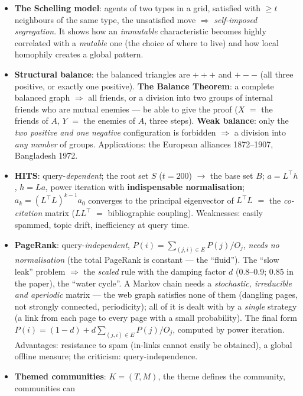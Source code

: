 \documentclass[11pt,a4paper]{article}
\theoremstyle{definition}
\providecommand{\uv}[1]{``#1''}
\begin{document}
\begin{itemize}
      \emph{diminishing returns}.
\item \textbf{The Schelling model}: agents of two types in a grid, satisfied with $\ge t$ neighbours of
      the same type, the unsatisfied move $\Rightarrow$ \emph{self-imposed segregation}. It shows how an
      \emph{immutable} characteristic becomes highly correlated with a \emph{mutable} one (the choice of
      where to live) and how local homophily creates a global pattern.
\item \textbf{Structural balance}: the balanced triangles are $+{+}{+}$ and $+{-}{-}$ (all three
      positive, or exactly one positive). \textbf{The Balance Theorem}: a complete balanced graph
      $\Rightarrow$ all friends, or a division into two groups of internal friends who are mutual
      enemies --- be able to give the proof ($X$ $=$ the friends of $A$, $Y$ $=$ the enemies of $A$,
      three steps). \textbf{Weak balance}: only the \emph{two positive and one negative} configuration
      is forbidden $\Rightarrow$ a division into \emph{any number} of groups. Applications: the European
      alliances 1872--1907, Bangladesh 1972.
\item \textbf{HITS}: query-\emph{dependent}; the root set $S$ ($t=200$) $\to$ the base set $B$;
      $a=L^{\!\top}h$, $h=La$, power iteration with \textbf{indispensable normalisation};
      $a_k=(L^{\!\top}L)^{k-1}a_0$ converges to the principal eigenvector of $L^{\!\top}L$ $=$ the
      \emph{co-citation} matrix ($LL^{\!\top}$ $=$ bibliographic coupling). Weaknesses: easily spammed,
      topic drift, inefficiency at query time.
\item \textbf{PageRank}: query-\emph{independent}, $P(i)=\sum_{(j,i)\in E}P(j)/O_j$, \emph{needs no
      normalisation} (the total PageRank is constant --- the \uv{fluid}). The \uv{slow leak} problem
      $\Rightarrow$ the \emph{scaled} rule with the damping factor $d$ (0.8--0.9; $0.85$ in the paper),
      the \uv{water cycle}. A Markov chain needs a \emph{stochastic, irreducible and aperiodic} matrix
      --- the web graph satisfies none of them (dangling pages, not strongly connected, periodicity);
      all of it is dealt with by a \emph{single} strategy (a link from each page to every page with a
      small probability). The final form $P(i)=(1-d)+d\sum_{(j,i)\in E}P(j)/O_j$, computed by power
      iteration. Advantages: resistance to spam (in-links cannot easily be obtained), a global offline
      measure; the criticism: query-independence.
\item \textbf{Themed communities}: $K=(T,M)$, the theme defines the community, communities can

\end{itemize}
\end{document}
